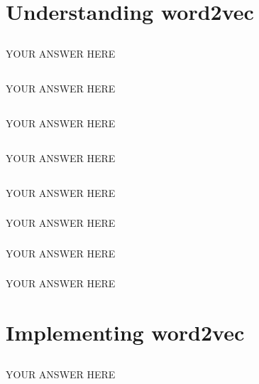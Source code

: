 \documentclass{article}
\begin{document}
\section{Understanding word2vec}
\subsection{}
YOUR ANSWER HERE
\subsection{}
YOUR ANSWER HERE
\subsection{}
YOUR ANSWER HERE
\subsection{}
YOUR ANSWER HERE
\subsection{}
YOUR ANSWER HERE
\subsubsection{}
YOUR ANSWER HERE
\subsubsection{}
YOUR ANSWER HERE
\subsubsection{}
YOUR ANSWER HERE
\section{Implementing word2vec}
\setcounter{subsection}{4}
\subsection{}
YOUR ANSWER HERE
		
\end{document}
